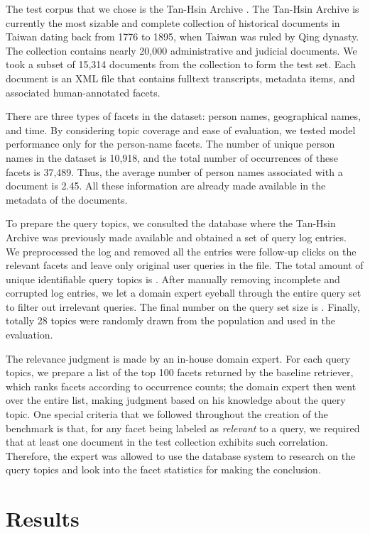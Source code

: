 The test corpus that we chose is the Tan-Hsin Archive .  The
Tan-Hsin Archive is currently the most sizable and complete collection of
historical documents in Taiwan dating back from 1776 to 1895, when Taiwan was
ruled by Qing dynasty.  The collection contains nearly 20,000 administrative
and judicial documents.  We took a subset of 15,314 documents from the
collection to form the test set.  Each document is an XML file that contains
fulltext transcripts, metadata items, and associated human-annotated facets.  

There are three types of facets in the dataset: person names, geographical
names, and time.  By considering topic coverage and ease of evaluation, we
tested model performance only for the person-name facets.  The number of unique
person names in the dataset is 10,918, and the total number of occurrences of
these facets is 37,489.  Thus, the average number of person names associated
with a document is 2.45.  All these information are already made available in
the metadata of the documents.  

To prepare the query topics, we consulted the database where the Tan-Hsin
Archive was previously made available and obtained a set of query log entries.
We preprocessed the log and removed all the entries were follow-up clicks on
the relevant facets and leave only original user queries in the file.  The
total amount of unique identifiable query topics is .  After
manually removing incomplete and corrupted log entries, we let a domain expert
eyeball through the entire query set to filter out irrelevant queries.   The
final number on the query set size is .  Finally, totally 28
topics were randomly drawn from the population and used in the evaluation.

The relevance judgment is made by an in-house domain expert.  For each query
topics, we prepare a list of the top 100 facets returned by the baseline
retriever, which ranks facets according to occurrence counts; the domain expert
then went over the entire list, making judgment based on his knowledge about
the query topic.  One special criteria that we followed throughout the creation
of the benchmark is that, for any facet being labeled as \emph{relevant} to a
query, we required that at least one document in the test collection exhibits
such correlation.  Therefore, the expert was allowed to use the database system
to research on the query topics and look into the facet statistics for making
the conclusion.

\section{Results}

